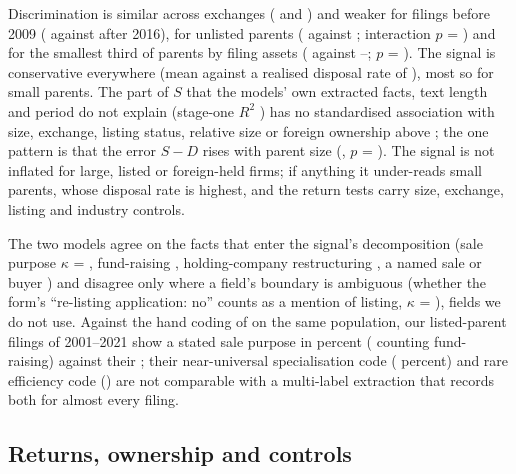 Discrimination is similar across exchanges (\ValAUCKosdaqKosdaq{} and \ValAUCKosdaqKospiOther{}) and weaker for filings before 2009 (\ValAUCPeriodEarly{} against \ValAUCPeriodLate{} after 2016), for unlisted parents (\ValAUCListedUnlisted{} against \ValAUCListedListed{}; interaction $p$ = \ValLRDiscListed{}) and for the smallest third of parents by filing assets (\ValAUCSizeSmall{} against \ValAUCSizeMid{}--\ValAUCSizeLarge{}; $p$ = \ValLRDiscSize{}). The signal is conservative everywhere (mean \ValMeanS{} against a realised disposal rate of \ValMeanY{}), most so for small parents. The part of $S$ that the models' own extracted facts, text length and period do not explain (stage-one $R^2$ \ValStageOneRTwo{}) has no standardised association with size, exchange, listing status, relative size or foreign ownership above \ValMaxBeta{}; the one pattern is that the error $S - D$ rises with parent size (\ValErrSizeBeta{}, $p$ = \ValErrSizeP{}). The signal is not inflated for large, listed or foreign-held firms; if anything it under-reads small parents, whose disposal rate is highest, and the return tests carry size, exchange, listing and industry controls.

The two models agree on the facts that enter the signal's decomposition (sale purpose $\kappa$ = \KappaSale{}, fund-raising \KappaFund{}, holding-company restructuring \KappaHolding{}, a named sale or buyer \KappaBuyer{}) and disagree only where a field's boundary is ambiguous (whether the form's ``re-listing application: no'' counts as a mention of listing, $\kappa$ = \KappaListing{}), fields we do not use. Against the hand coding of  on the same population, our listed-parent filings of 2001--2021 show a stated sale purpose in \OurSaleStrict{} percent (\OurSaleBroad{} counting fund-raising) against their \KLSale{}; their near-universal specialisation code (\KLSpecial{} percent) and rare efficiency code (\KLEff{}) are not comparable with a multi-label extraction that records both for almost every filing.

\subsection{Returns, ownership and controls}\label{sec:returns}

